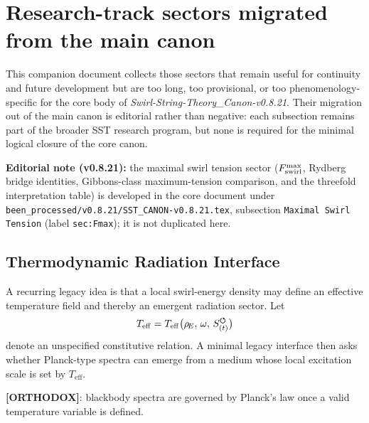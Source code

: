 \makeatletter
{}
\makeatother


\section{Research-track sectors migrated from the main canon}

\noindent
This companion document collects those sectors that remain useful for continuity and future development but are too long, too provisional, or too phenomenology-specific for the core body of \textit{Swirl-String-Theory\_Canon-v0.8.21}. Their migration out of the main canon is editorial rather than negative: each subsection remains part of the broader SST research program, but none is required for the minimal logical closure of the core canon.

\medskip
\noindent
\textbf{Editorial note (v0.8.21):} the maximal swirl tension sector ($F_{\rm swirl}^{\max}$, Rydberg bridge identities, Gibbons-class maximum-tension comparison, and the threefold interpretation table) is developed in the core document under \verb|been_processed/v0.8.21/SST_CANON-v0.8.21.tex|, subsection \texttt{Maximal Swirl Tension} (label \texttt{sec:Fmax}); it is not duplicated here.

\medskip








\subsection{Thermodynamic Radiation Interface}
A recurring legacy idea is that a local swirl-energy density may define an effective temperature field and thereby an emergent radiation sector. Let
\begin{align}
    T_{\mathrm{eff}} = T_{\mathrm{eff}}\big(\rho_{\!E},\, \omega,\, S_{(t)}^{\boldsymbol{\circlearrowleft}}\big)
\end{align}
denote an unspecified constitutive relation. A minimal legacy interface then asks whether Planck-type spectra can emerge from a medium whose local excitation scale is set by $T_{\mathrm{eff}}$.

\textbf{[ORTHODOX]}: blackbody spectra are governed by Planck's law once a valid temperature variable is defined.

